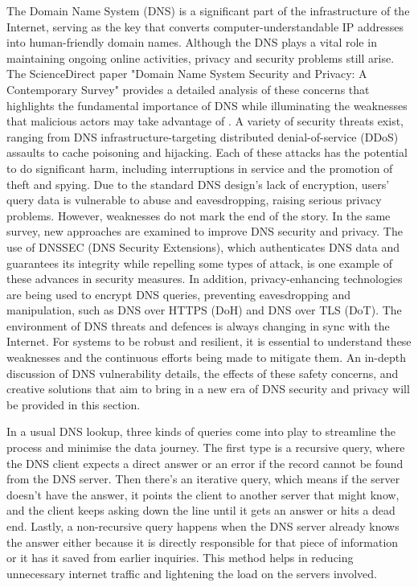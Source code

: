 The Domain Name System (DNS) is a significant part of the infrastructure of the Internet, serving as the key that converts computer-understandable IP addresses into human-friendly domain names. Although the DNS plays a vital role in maintaining ongoing online activities, privacy and security problems still arise. The ScienceDirect paper "Domain Name System Security and Privacy: A Contemporary Survey" provides a detailed analysis of these concerns that highlights the fundamental importance of DNS while illuminating the weaknesses that malicious actors may take advantage of \cite * {Sciencedirect2023dns}. A variety of security threats exist, ranging from DNS infrastructure-targeting distributed denial-of-service (DDoS) assaults to cache poisoning and hijacking. Each of these attacks has the potential to do significant harm, including interruptions in service and the promotion of theft and spying. Due to the standard DNS design's lack of encryption, users' query data is vulnerable to abuse and eavesdropping, raising serious privacy problems. However, weaknesses do not mark the end of the story. In the same survey, new approaches are examined to improve DNS security and privacy. The use of DNSSEC (DNS Security Extensions), which authenticates DNS data and guarantees its integrity while repelling some types of attack, is one example of these advances in security measures. In addition, privacy-enhancing technologies are being used to encrypt DNS queries, preventing eavesdropping and manipulation, such as DNS over HTTPS (DoH) and DNS over TLS (DoT). The environment of DNS threats and defences is always changing in sync with the Internet. For systems to be robust and resilient, it is essential to understand these weaknesses and the continuous efforts being made to mitigate them. An in-depth discussion of DNS vulnerability details, the effects of these safety concerns, and creative solutions that aim to bring in a new era of DNS security and privacy will be provided in this section.

In a usual DNS lookup, three kinds of queries come into play to streamline the process and minimise the data journey. The first type is a recursive query, where the DNS client expects a direct answer or an error if the record cannot be found from the DNS server. Then there's an iterative query, which means if the server doesn't have the answer, it points the client to another server that might know, and the client keeps asking down the line until it gets an answer or hits a dead end. Lastly, a non-recursive query happens when the DNS server already knows the answer either because it is directly responsible for that piece of information or it has it saved from earlier inquiries. This method helps in reducing unnecessary internet traffic and lightening the load on the servers involved.

